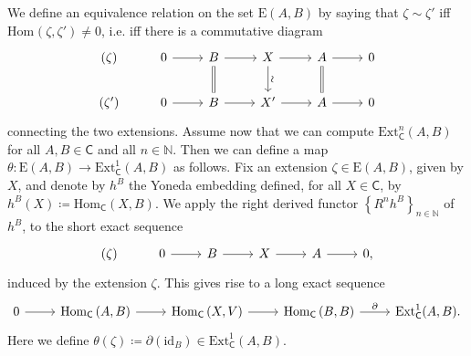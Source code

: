\documentclass[../Main]{subfiles}
\begin{document}
\begin{rem}[]\label{rem:YonedaExensionTheta}
	We define an equivalence relation on the set $\mathrm{E}(A,B)$ by
	saying that $\zeta \sim \zeta'$ 
	iff $\mathrm{Hom}_{  } \left( \zeta, \zeta' \right) \neq 0$,
	i.e. iff there is a commutative diagram
	\begin{equation*}
	\begin{tikzcd}
		(\zeta) &
		0 \arrow[r, "", rightarrow] &
		B \arrow[r, "", rightarrow] 
		\arrow[d, "", equals] &
		X \arrow[r, "", rightarrow] 
		\arrow[d, "\rotatebox{90}{\(\sim\)}", rightarrow] &
		A \arrow[r, "", rightarrow] 
		\arrow[d, "", equals] &
		0\\
		(\zeta') &
		0 \arrow[r, "", rightarrow] &
		B \arrow[r, "", rightarrow] &
		X' \arrow[r, "", rightarrow] &
		A \arrow[r, "", rightarrow] &
		0
	\end{tikzcd}
	\end{equation*}
	connecting the two extensions.
	Assume now that we can compute $\mathrm{Ext}^n_{\mathsf{C}}(A, B)$
	for all $A,B \in \mathsf{C}$ and all $n \in \mathbb{N}$.
	Then we can define a map $\theta\colon \mathrm{E}(A,B) \to 
	\mathrm{Ext}^1_{\mathsf{C}}(A,B)$ as follows.
	Fix an extension $\zeta \in \mathrm{E}(A,B)$, given by $X$,
	and denote by $h^B$ the Yoneda
	embedding defined, for all $X \in \mathsf{C}$, by
	$h^B(X) \coloneqq \mathrm{Hom}_{\mathsf{C}} \left( X, B \right)$.
	We apply the right derived functor 
	$\left\{ R^n h^B \right\}_{n \in \mathbb{N}}$ of $h^B$, 
	to the short exact sequence
	\begin{equation*}
	\begin{tikzcd}
		(\zeta) &
		0 \arrow[r, "", rightarrow] &
		B \arrow[r, "", rightarrow] &
		X \arrow[r, "", rightarrow] &
		A \arrow[r, "", rightarrow] &
		0
	,\end{tikzcd}
	\end{equation*}
	induced by the extension $\zeta$.
	This gives rise to a long exact sequence
	\begin{equation*}
	\begin{tikzcd}
		0 \arrow[r, "", rightarrow] &
		\mathrm{Hom}_{\mathsf{C}} \left( A, B \right) \arrow[r, "", rightarrow] &
		\mathrm{Hom}_{\mathsf{C}} \left( X, V \right) \arrow[r, "", rightarrow] &
		\mathrm{Hom}_{\mathsf{C}} \left( B, B \right) \arrow[r, "\partial", rightarrow] &
		\mathrm{Ext}^1_{\mathsf{C}}(A,B)
	.\end{tikzcd}
	\end{equation*}
	Here we define $\theta(\zeta) \coloneqq \partial(\mathrm{id}_{ B }) \in \mathrm{Ext}^1_{\mathsf{C}}
	(A,B)$.
\end{rem}
\end{document}
